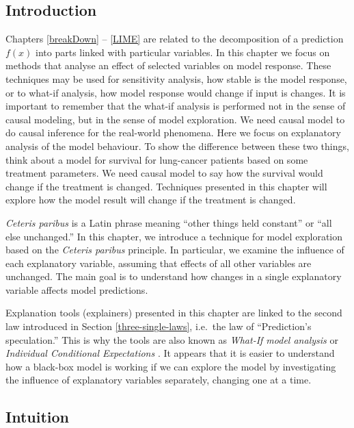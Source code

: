 \documentclass[12pt,]{krantz}
\begin{document}
\hypertarget{CPIntro}{%
\subsection{Introduction}\label{CPIntro}}

Chapters \ref{breakDown} -- \ref{LIME} are related to the decomposition of a prediction \(f(x)\) into parts linked with particular variables. In this chapter we focus on methods that analyse an effect of selected variables on model response. These techniques may be used for sensitivity analysis, how stable is the model response, or to what-if analysis, how model response would change if input is changes. It is important to remember that the what-if analysis is performed not in the sense of causal modeling, but in the sense of model exploration. We need causal model to do causal inference for the real-world phenomena. Here we focus on explanatory analysis of the model behaviour. To show the difference between these two things, think about a model for survival for lung-cancer patients based on some treatment parameters. We need causal model to say how the survival would change if the treatment is changed. Techniques presented in this chapter will explore how the model result will change if the treatment is changed.

\emph{Ceteris paribus} is a Latin phrase meaning ``other things held constant'' or ``all else unchanged.'' In this chapter, we introduce a technique for model exploration based on the \emph{Ceteris paribus} principle. In particular, we examine the influence of each explanatory variable, assuming that effects of all other variables are unchanged. The main goal is to understand how changes in a single explanatory variable affects model predictions.

Explanation tools (explainers) presented in this chapter are linked to the second law introduced in Section \ref{three-single-laws}, i.e.~the law of ``Prediction's speculation.'' This is why the tools are also known as \emph{What-If model analysis} or \emph{Individual Conditional Expectations} \citep{ICEbox}. It appears that it is easier to understand how a black-box model is working if we can explore the model by investigating the influence of explanatory variables separately, changing one at a time.

\hypertarget{CPIntuition}{%
\subsection{Intuition}\label{CPIntuition}}
\end{document}
